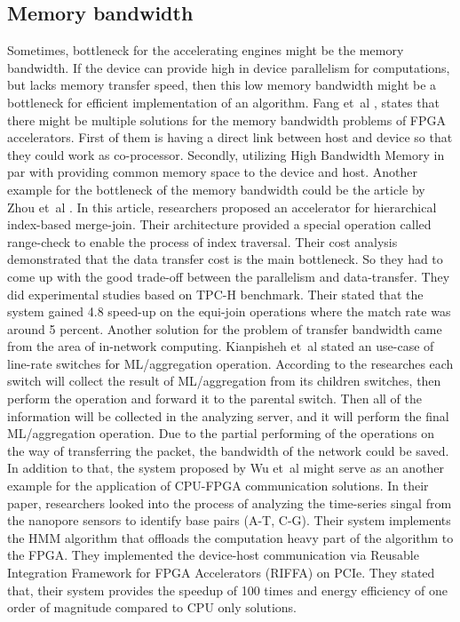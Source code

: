 \documentclass[conference]{IEEEtran}
\begin{document}
\subsection{Memory bandwidth}
Sometimes, bottleneck for the accelerating engines might be the memory bandwidth. If the device can provide high in device parallelism for computations, but lacks memory transfer speed, then this low memory bandwidth might be a bottleneck for efficient implementation of an algorithm. Fang et~al \cite{ref2}, states that there might be multiple solutions for the memory bandwidth problems of FPGA accelerators. First of them is having a direct link between host and device so that they could work as co-processor. Secondly, utilizing High Bandwidth Memory in par with providing common memory space to the device and host. Another example for the bottleneck of the memory bandwidth could be the article by Zhou et~al \cite{ref1}. In this article, researchers proposed an accelerator for hierarchical index-based merge-join. Their architecture provided a special operation called range-check to enable the process of index traversal. Their cost analysis demonstrated that the data transfer cost is the main bottleneck. So they had to come up with the good trade-off between the parallelism and data-transfer. They did experimental studies based on TPC-H benchmark. Their stated that the system gained 4.8 speed-up on the equi-join operations where the match rate was around 5 percent. Another solution for the problem of transfer bandwidth came from the area of in-network computing. Kianpisheh et~al \cite{ref8} stated an use-case of line-rate switches for ML/aggregation operation. According to the researches each switch will collect the result of ML/aggregation from its children switches, then perform the operation and forward it to the parental switch. Then all of the information will be collected in the analyzing server, and it will perform the final ML/aggregation operation. Due to the partial performing of the operations on the way of transferring the packet, the bandwidth of the network could be saved. In addition to that, the system proposed by Wu et~al \cite{ref11} might serve as an another example for the application of CPU-FPGA communication solutions. In their paper, researchers looked into the process of analyzing the time-series singal from the nanopore sensors to identify base pairs (A-T, C-G). Their system implements the HMM algorithm that offloads the computation heavy part of the algorithm to the FPGA. They implemented the device-host communication via Reusable Integration Framework for FPGA Accelerators (RIFFA) on PCIe. They stated that, their system provides the speedup of 100 times and energy efficiency of one order of magnitude compared to CPU only solutions.   
\end{document}
